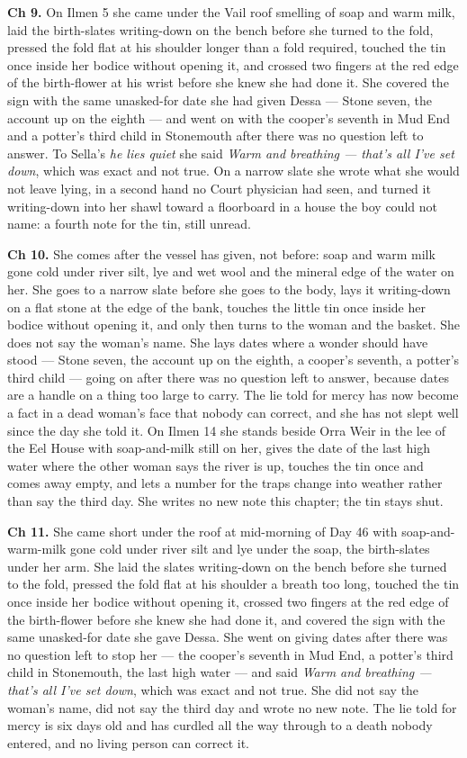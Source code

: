 \documentclass{design/chronicle}
\begin{document}
{\textbf{Ch 9.} On Ilmen 5 she came under the Vail roof smelling of soap and warm milk, laid the birth-slates writing-down on the bench before she turned to the fold, pressed the fold flat at his shoulder longer than a fold required, touched the tin once inside her bodice without opening it, and crossed two fingers at the red edge of the birth-flower at his wrist before she knew she had done it. She covered the sign with the same unasked-for date she had given Dessa --- Stone seven, the account up on the eighth --- and went on with the cooper’s seventh in Mud End and a potter’s third child in Stonemouth after there was no question left to answer. To Sella’s \emph{he lies quiet} she said \emph{Warm and breathing --- that’s all I’ve set down}, which was exact and not true. On a narrow slate she wrote what she would not leave lying, in a second hand no Court physician had seen, and turned it writing-down into her shawl toward a floorboard in a house the boy could not name: a fourth note for the tin, still unread.

\textbf{Ch 10.} She comes after the vessel has given, not before: soap and warm milk gone cold under river silt, lye and wet wool and the mineral edge of the water on her. She goes to a narrow slate before she goes to the body, lays it writing-down on a flat stone at the edge of the bank, touches the little tin once inside her bodice without opening it, and only then turns to the woman and the basket. She does not say the woman’s name. She lays dates where a wonder should have stood --- Stone seven, the account up on the eighth, a cooper’s seventh, a potter’s third child --- going on after there was no question left to answer, because dates are a handle on a thing too large to carry. The lie told for mercy has now become a fact in a dead woman’s face that nobody can correct, and she has not slept well since the day she told it. On Ilmen 14 she stands beside Orra Weir in the lee of the Eel House with soap-and-milk still on her, gives the date of the last high water where the other woman says the river is up, touches the tin once and comes away empty, and lets a number for the traps change into weather rather than say the third day. She writes no new note this chapter; the tin stays shut.

\textbf{Ch 11.} She came short under the roof at mid-morning of Day 46 with soap-and-warm-milk gone cold under river silt and lye under the soap, the birth-slates under her arm. She laid the slates writing-down on the bench before she turned to the fold, pressed the fold flat at his shoulder a breath too long, touched the tin once inside her bodice without opening it, crossed two fingers at the red edge of the birth-flower before she knew she had done it, and covered the sign with the same unasked-for date she gave Dessa. She went on giving dates after there was no question left to stop her --- the cooper’s seventh in Mud End, a potter’s third child in Stonemouth, the last high water --- and said \emph{Warm and breathing --- that’s all I’ve set down}, which was exact and not true. She did not say the woman’s name, did not say the third day and wrote no new note. The lie told for mercy is six days old and has curdled all the way through to a death nobody entered, and no living person can correct it.

}
\end{document}
